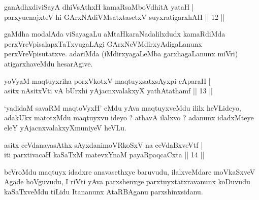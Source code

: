\begin{shl}
ganAdhxdiviSayA dhiVsAthxH kamaRsaMboVdhitA yataH |\\
parxyucnajxteV hi GArxNAdiVMsatxtasetxV suyxratigarxhAH \hfill || 12 ||
\end{shl}

\begin{artha}
gaMdha modalAda viSayagaLu aMtaHkaraNadalilxdudx kamaRdiMda perxVreVpisalapxTaTx\-vugaLAgi GArxNeVMdirxyAdigaLanunx perxVreVpisutatxve. adariMda (iMdirxyagaLeMba garxhagaLanunx miVri) atigarxhaveMdu hesarAgive.
\end{artha}


\begin{shl}
yoV\s yaM maqtuyxriha porxVkotxV maqtuyxsatxsAyxpi cAparaH |\\
asitx nAsitxVti vA bUrxhi yAjacnxvalakxyX yathAtathamf \hfill || 13 ||
\end{shl}

\begin{artha}
`yadidaM savaRM maqtoVyxH' eMdu yAva maqtuyxveMdu ililx heVLideyo, adakUkx matotxMdu maqtuyxvu ideyo ? athavA ilalxvo ? adanunx idadxMteye eleY yAjacnxvalakxyXmuniyeV heVLu.
\end{artha}

\begin{shl}
asitx ceVdanavasAthx sAyxdanimoVRkoSxV na ceVdaBxveVtf |\\
iti parxtivacaH kaSaTxM matevxYnaM payaRpaqcaCxta \hfill || 14 ||
\end{shl}

\begin{artha}
beVroMdu maqtuyx idadxre anavasethxye baruvudu, ilalxveMdare moVkaSxveV Agade hoVguvudu, I riVti yAva parxshenxge parxtuyxtatxravanunx koDuvudu kaSaTxveMdu tiLidu Itananunx AtaRBAganu parxshinxsidanu.
\end{artha}

